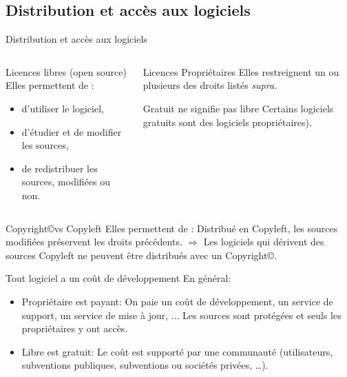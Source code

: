 \subsection{Distribution et accès aux logiciels}
\begin{frame}{Distribution et accès aux logiciels}
  \begin{columns}
    \begin{column}{6cm}
      \begin{block}{Licences libres (open source)}
        Elles permettent de :
        \begin{itemize}
        \item d'utiliser le logiciel,
        \item d'étudier et de modifier les sources,
        \item de redistribuer les sources, modifiées ou non.
        \end{itemize}
      \end{block}
    \end{column}
    \begin{column}{5cm}
      \begin{block}{Licences Propriétaires}
        Elles restreignent un ou plusieurs des droits listés \it{supra}.
      \end{block}
      \begin{block}{Gratuit ne signifie pas libre}
        Certains logiciels gratuits sont des logiciels propriétaires).
      \end{block}
    \end{column}
  \end{columns}
  \begin{block}{Copyright\copyright vs Copyleft\textcopyleft}
    Elles permettent de :
    Distribué en Copyleft\textcopyleft, les sources modifiées préservent les droits précédents.
    $\Rightarrow$ Les logiciels qui dérivent des sources Copyleft ne peuvent être distribués avec un Copyright\copyright.
  \end{block}
  \begin{block}{Tout logiciel a un coût de développement}
    En général:
    \begin{itemize}
    \item Propriétaire est payant: On paie un coût de développement, un service de support, un service de mise à jour, ... Les sources sont protégées et seuls les propriétaires y ont accès.
    \item Libre est gratuit: Le coût est supporté par une communauté (utilisateurs, subventions publiques, subventions ou sociétés privées, \dots).
    \end{itemize}
  \end{block}
\end{frame}
